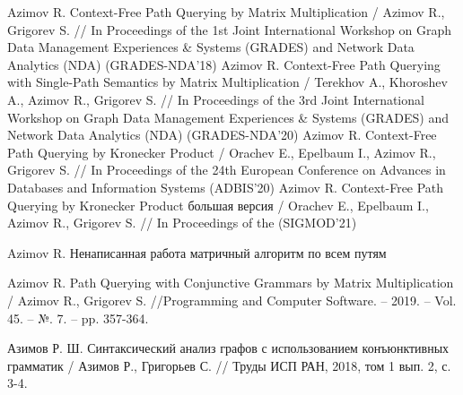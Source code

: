 \begin{thebibliography}{99}
	 Azimov R. Context-Free Path Querying by
	Matrix Multiplication / Azimov R., Grigorev S. // In Proceedings of the
	1st Joint International Workshop on Graph Data Management Experiences \&
	Systems (GRADES) and Network Data Analytics (NDA) (GRADES-NDA’18)
	 Azimov R. Context-Free Path Querying with Single-Path Semantics by
	Matrix Multiplication / Terekhov A., Khoroshev A., Azimov R., Grigorev S. // In Proceedings of the
	3rd Joint International Workshop on Graph Data Management Experiences \&
	Systems (GRADES) and Network Data Analytics (NDA) (GRADES-NDA’20)
	 Azimov R. Context-Free Path Querying by Kronecker
	Product / Orachev E., Epelbaum I., Azimov R., Grigorev S. // In Proceedings of the
	24th European Conference on Advances in Databases and Information Systems (ADBIS’20)
	 Azimov R. Context-Free Path Querying by Kronecker
	Product большая версия / Orachev E., Epelbaum I., Azimov R., Grigorev S. // In Proceedings of the (SIGMOD’21)
	
	 Azimov R. Ненаписанная работа матричный алгоритм по всем путям
	
	 Azimov R. Path Querying with Conjunctive Grammars by Matrix Multiplication / Azimov R., Grigorev S. //Programming and Computer Software. – 2019. – Vol. 45. – №. 7. – pp. 357-364.
	\setcounter{firstbib}{\value{enumiv}}
	
	 Азимов Р. Ш. Синтаксический анализ графов с использованием конъюнктивных грамматик / Азимов Р., Григорьев С. // Труды ИСП РАН, 2018, том 1 вып. 2, с. 3-4.
	
\end{thebibliography}